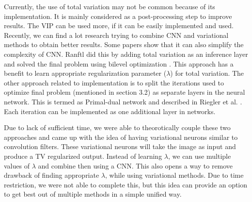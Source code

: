 Currently, the use of total variation may not be common because of its implementation. It is mainly considered as a post-processing step to improve results. The VIP can be used more, if it can be easily implemented and used. Recently, we can find a lot research trying to combine CNN and variational methods to obtain better results. Some papers show that it can also simplify the complexity of CNN. Ranftl \cite{ranftl:2014} did this by adding total variation as an inference layer and solved the final problem using bilevel optimization \cite{ochs:2015}. This approach has a benefit to learn appropriate regularization parameter ($\lambda$) for total variation. The other approach related to implementation is to split the iterations used to optimize final problem (mentioned in section 3.2) as separate layers in the neural network. This is termed as Primal-dual network and described in Riegler et al. \cite{riegler:2016}. Each iteration can be implemented as one additional layer in networks. \par 
Due to lack of sufficient time, we were able to theorotically couple these two approaches and came up with the idea of having variational neurons similar to convolution filters. These variational neurons will take the image as input and produce a TV regularized output. Instead of learning $\lambda$, we can use multiple values of $\lambda$ and combine then using a CNN. This also opens a way to remove drawback of finding appropriate $\lambda$, while using variational methods. Due to time restriction, we were not able to complete this, but this idea can provide an option to get best out of multiple methods in a simple unified way. 